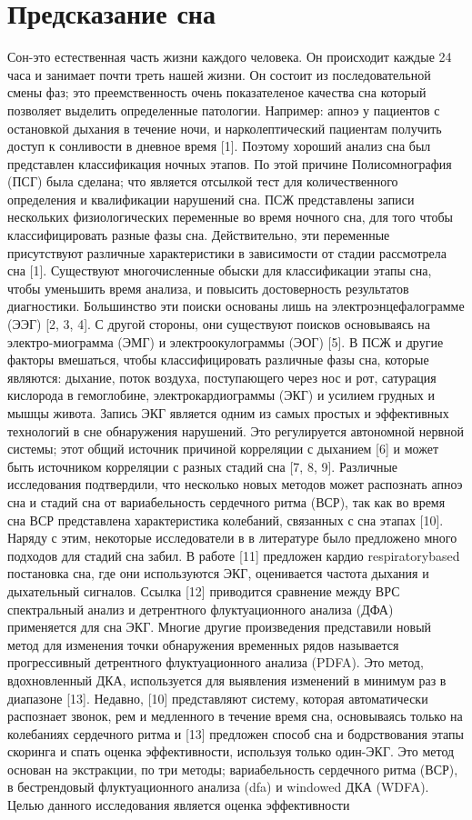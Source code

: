 \section{Предсказание сна}

Сон-это естественная часть жизни каждого человека. Он происходит каждые 24 часа и занимает почти треть нашей жизни. Он состоит из последовательной смены фаз; это преемственность очень показателеное качества сна который позволяет выделить определенные патологии. Например: апноэ у пациентов с остановкой дыхания в течение ночи, и нарколептический пациентам получить доступ к сонливости в дневное время [1]. Поэтому хороший анализ сна был представлен
классификация ночных этапов. По этой причине
Полисомнография (ПСГ) была сделана; что является отсылкой
тест для количественного определения и квалификации нарушений сна. ПСЖ
представлены записи нескольких физиологических
переменные во время ночного сна, для того чтобы классифицировать
разные фазы сна. Действительно, эти переменные присутствуют
различные характеристики в зависимости от стадии
рассмотрела сна [1]. Существуют многочисленные обыски для классификации
этапы сна, чтобы уменьшить время анализа, и
повысить достоверность результатов диагностики. Большинство
эти поиски основаны лишь на электроэнцефалограмме
(ЭЭГ) [2, 3, 4]. С другой стороны, они существуют поисков
основываясь на электро-миограмма (ЭМГ) и электроокулограммы
(ЭОГ) [5]. В ПСЖ и другие факторы
вмешаться, чтобы классифицировать различные фазы сна, которые являются:
дыхание, поток воздуха, поступающего через нос и
рот, сатурация кислорода в гемоглобине, электрокардиограммы
(ЭКГ) и усилием грудных и
мышцы живота.
Запись ЭКГ является одним из самых простых и эффективных
технологий в сне обнаружения нарушений. Это регулируется
автономной нервной системы; этот общий источник
причиной корреляции с дыханием [6] и может быть источником
корреляции с разных стадий сна [7, 8, 9].
Различные исследования подтвердили, что несколько новых методов
может распознать апноэ сна и стадий сна от
вариабельность сердечного ритма (ВСР), так как во время сна ВСР
представлена характеристика колебаний, связанных с сна
этапах [10]. Наряду с этим, некоторые исследователи в
в литературе было предложено много подходов для стадий сна
забил. В работе [11] предложен кардио respiratorybased
постановка сна, где они используются ЭКГ, оценивается
частота дыхания и дыхательный сигналов.
Ссылка [12] приводится сравнение между ВРС
спектральный анализ и детрентного флуктуационного анализа (ДФА)
применяется для сна ЭКГ. Многие другие произведения представили новый
метод для изменения точки обнаружения временных рядов называется
прогрессивный детрентного флуктуационного анализа (PDFA). Это
метод, вдохновленный ДКА, используется для выявления изменений в
минимум раз в диапазоне [13]. Недавно, [10] представляют систему, которая
автоматически распознает звонок, рем и медленного в течение
время сна, основываясь только на колебаниях сердечного ритма и [13]
предложен способ сна и бодрствования этапы скоринга и спать
оценка эффективности, используя только один-ЭКГ. Это
метод основан на экстракции, по три
методы; вариабельность сердечного ритма (ВСР), в бестрендовый
флуктуационного анализа (dfa) и windowed ДКА (WDFA).
Целью данного исследования является оценка эффективности
